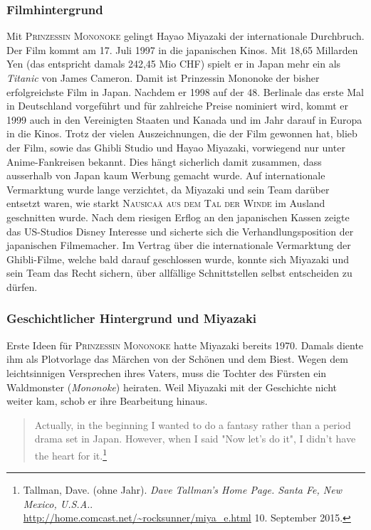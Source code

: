 \subsubsection{Filmhintergrund} 
Mit \textsc{Prinzessin Mononoke} gelingt Hayao Miyazaki der internationale Durchbruch. Der Film kommt am 17. Juli 1997 in die japanischen Kinos. Mit 18,65 Millarden Yen (das entspricht damals 242,45 Mio CHF) spielt er in Japan mehr ein als \emph{Titanic} von James Cameron. Damit ist Prinzessin Mononoke der bisher erfolgreichste Film in Japan. Nachdem er 1998 auf der 48. Berlinale das erste Mal in Deutschland vorgeführt und für zahlreiche Preise nominiert wird, kommt er 1999 auch in den Vereinigten Staaten und Kanada und im Jahr darauf in Europa in die Kinos. Trotz der vielen Auszeichnungen, die der Film gewonnen hat, blieb der Film, sowie das Ghibli Studio und Hayao Miyazaki, vorwiegend nur unter Anime-Fankreisen bekannt. Dies hängt sicherlich damit zusammen, dass ausserhalb von Japan kaum Werbung gemacht wurde. Auf internationale Vermarktung wurde lange verzichtet, da Miyazaki und sein Team darüber entsetzt waren, wie starkt \textsc{Nausicaä aus dem Tal der Winde} im Ausland geschnitten wurde. 
Nach dem riesigen Erflog an den japanischen Kassen zeigte das US-Studios Disney Interesse und sicherte sich die Verhandlungsposition der japanischen Filmemacher. Im Vertrag über die internationale Vermarktung der Ghibli-Filme, welche bald darauf geschlossen wurde, konnte sich Miyazaki und sein Team das Recht sichern, über allfällige Schnittstellen selbst entscheiden zu dürfen. 

\subsubsection*{Geschichtlicher Hintergrund und Miyazaki} 
Erste Ideen für \textsc{Prinzessin Mononoke} hatte Miyazaki bereits 1970. Damals diente ihm als Plotvorlage das Märchen von der Schönen und dem Biest. Wegen dem leichtsinnigen Versprechen ihres Vaters, muss die Tochter des Fürsten ein Waldmonster (\emph{Mononoke}) heiraten. Weil Miyazaki mit der Geschichte nicht weiter kam, schob er ihre Bearbeitung hinaus. 

\begin{quote} \glqq Actually, in the beginning I wanted to do a fantasy rather than a period drama set in Japan. However, when I said "Now let's do it", I didn't have the heart for it.\grqq \footnote{Tallman, Dave. (ohne Jahr). \emph{Dave Tallman's Home Page. Santa Fe, New Mexico, U.S.A.}.\\ \url{http://home.comcast.net/~rocksunner/miya_e.html} 10. September 2015.}
\end{quote}

